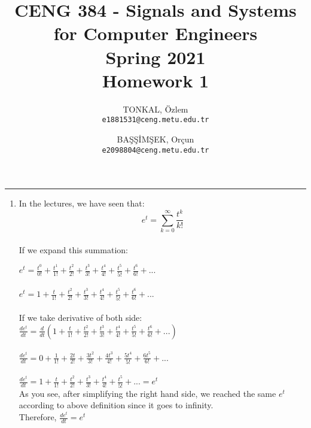 \documentclass[10pt,a4paper, margin=1in]{article}
\author{
  TONKAL, Özlem\\
  \texttt{e1881531@ceng.metu.edu.tr}
  \and
  BAŞŞİMŞEK, Orçun\\
  \texttt{e2098804@ceng.metu.edu.tr}
}
\title{CENG 384 - Signals and Systems for Computer Engineers \\
Spring 2021 \\
Homework 1}
\begin{document}
\maketitle



\noindent\rule{19cm}{1.2pt}

\begin{enumerate}

\item %
In the lectures, we have seen that: \\
\[ e^t = \sum_{k=0}^{\infty} \frac{t^k}{k!} \]
\\
If we expand this summation:

$e^t = \frac{t^0}{0!} + \frac{t^1}{1!} + \frac{t^2}{2!} + \frac{t^3}{3!} + \frac{t^4}{4!} + \frac{t^5}{5!} + \frac{t^6}{6!} + ...$ \\
\\
$e^t = 1 + \frac{t}{1!} + \frac{t^2}{2!} + \frac{t^3}{3!} + \frac{t^4}{4!} + \frac{t^5}{5!} + \frac{t^6}{6!} + ...$
\\
\\
If we take derivative of both side:
\\
$\frac{de^t}{dt} = \frac{d}{dt}(1 + \frac{t}{1!} + \frac{t^2}{2!} + \frac{t^3}{3!} + \frac{t^4}{4!} + \frac{t^5}{5!} + \frac{t^6}{6!} + ...)$ \\
\\
$\frac{de^t}{dt} = 0 + \frac{1}{1!} + \frac{2t}{2!} + \frac{3t^2}{3!} + \frac{4t^3}{4!} + \frac{5t^4}{5!} + \frac{6t^5}{6!} + ...$ \\
\\
$\frac{de^t}{dt} = 1 + \frac{t}{1!} + \frac{t^2}{2!} + \frac{t^3}{3!} + \frac{t^4}{4!} + \frac{t^5}{5!} + ... = e^t$
\\
As you see, after simplifying the right hand side, we reached the same $e^t$ according to above definition since it goes to infinity. \\
Therefore, $\frac{de^t}{dt} = e^t$


\end{enumerate}
\end{document}
